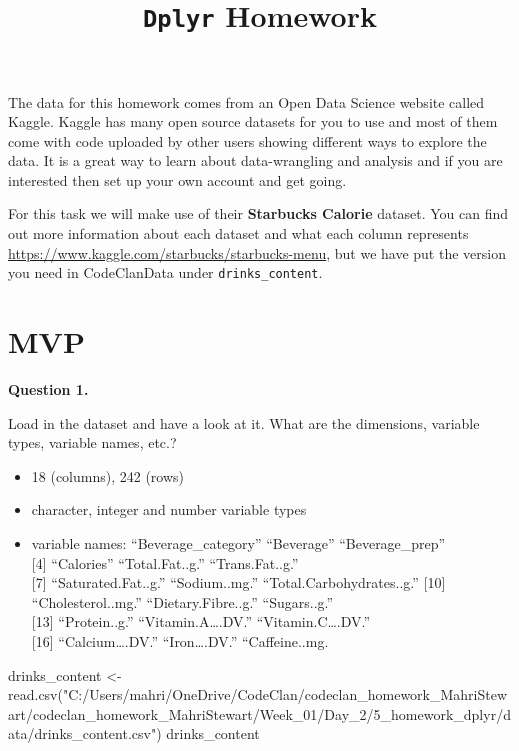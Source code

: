\documentclass[
]{article}
\title{\texttt{Dplyr} Homework}
\author{}
\date{\vspace{-2.5em}}
\newenvironment{Shaded}{\begin{snugshade}}{\end{snugshade}}
\newcommand{\FunctionTok}[1]{\textcolor[rgb]{0.00,0.00,0.00}{#1}}
\newcommand{\NormalTok}[1]{#1}
\newcommand{\OtherTok}[1]{\textcolor[rgb]{0.56,0.35,0.01}{#1}}
\newcommand{\StringTok}[1]{\textcolor[rgb]{0.31,0.60,0.02}{#1}}
\providecommand{\tightlist}{%
  \setlength{\itemsep}{0pt}\setlength{\parskip}{0pt}}
\begin{document}
\maketitle

The data for this homework comes from an Open Data Science website
called Kaggle. Kaggle has many open source datasets for you to use and
most of them come with code uploaded by other users showing different
ways to explore the data. It is a great way to learn about
data-wrangling and analysis and if you are interested then set up your
own account and get going.

For this task we will make use of their \textbf{Starbucks Calorie}
dataset. You can find out more information about each dataset and what
each column represents
\href{https://www.kaggle.com/starbucks/starbucks-menu}{https://www.kaggle.com/starbucks/starbucks-menu},
but we have put the version you need in CodeClanData under
\texttt{drinks\_content}.

\hypertarget{mvp}{%
\section{MVP}\label{mvp}}

\textbf{Question 1.}

Load in the dataset and have a look at it. What are the dimensions,
variable types, variable names, etc.?

\begin{itemize}
\tightlist
\item
  18 (columns), 242 (rows)\\
\item
  character, integer and number variable types
\item
  variable names: ``Beverage\_category'' ``Beverage''
  ``Beverage\_prep''\\
  {[}4{]} ``Calories'' ``Total.Fat..g.'' ``Trans.Fat..g.''\\
  {[}7{]} ``Saturated.Fat..g.'' ``Sodium..mg.''
  ``Total.Carbohydrates..g.'' {[}10{]} ``Cholesterol..mg.''
  ``Dietary.Fibre..g.'' ``Sugars..g.''\\
  {[}13{]} ``Protein..g.'' ``Vitamin.A\ldots.DV.''
  ``Vitamin.C\ldots.DV.''\\
  {[}16{]} ``Calcium\ldots.DV.'' ``Iron\ldots.DV.'' ``Caffeine..mg.
\end{itemize}

\begin{Shaded}
\begin{Highlighting}[]
\NormalTok{drinks\_content }\OtherTok{\textless{}{-}} \FunctionTok{read.csv}\NormalTok{(}\StringTok{"C:/Users/mahri/OneDrive/CodeClan/codeclan\_homework\_MahriStewart/codeclan\_homework\_MahriStewart/Week\_01/Day\_2/5\_homework\_dplyr/data/drinks\_content.csv"}\NormalTok{)}
\NormalTok{drinks\_content}
\end{Highlighting}
\end{Shaded}
\end{document}
